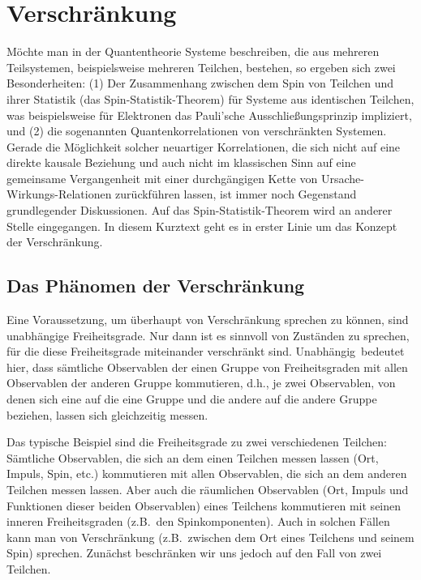
\chapter{Verschr\"ankung}
\label{chap_Entanglement}

M\"ochte man in der Quantentheorie Systeme beschreiben, die aus
mehreren Teilsystemen, beispielsweise mehreren Teilchen, bestehen, so ergeben
sich zwei Besonderheiten: (1) Der Zusammenhang zwischen dem Spin
von Teilchen und ihrer Statistik (das Spin-Statistik-Theorem) f\"ur
Systeme aus identischen Teilchen, was beispielsweise f\"ur Elektronen das Pauli'sche
Ausschlie\ss ungsprinzip impliziert, und
(2) die sogenannten Quantenkorrelationen von verschr\"ankten
Systemen. Gerade die M\"oglichkeit solcher neuartiger
Korrelationen, die sich nicht auf eine direkte kausale 
Beziehung und auch nicht im klassischen Sinn auf eine gemeinsame Vergangenheit
mit einer durchg\"angigen Kette von Ursache-Wirkungs-Relationen
zur\"uckf\"uhren lassen, ist immer noch Gegenstand grundlegender
Diskussionen. Auf das Spin-Statistik-Theorem wird an anderer Stelle
eingegangen. In diesem Kurztext geht es in erster Linie um das Konzept
der Verschr\"ankung. 

\section{Das Ph\"anomen der Verschr\"ankung}

Eine Voraussetzung, um \"uberhaupt von Verschr\"ankung sprechen zu k\"onnen,
sind unabh\"angige Freiheitsgrade. Nur dann ist es sinnvoll von Zust\"anden
zu sprechen, f\"ur die diese Freiheitsgrade miteinander verschr\"ankt sind. 
\glqq Unabh\"angig\grqq\ bedeutet hier,
dass s\"amtliche Observablen der einen Gruppe von Freiheitsgraden mit allen Observablen 
der anderen Gruppe kommutieren, d.h., je zwei Observablen, von denen sich 
eine auf die eine Gruppe und die andere auf die andere Gruppe beziehen, lassen sich gleichzeitig
messen.

Das typische Beispiel sind die Freiheitsgrade zu zwei verschiedenen Teilchen: 
S\"amtliche Observablen, die sich an dem einen Teilchen messen lassen (Ort, Impuls,
Spin, etc.) kommutieren mit allen Observablen, die sich an dem anderen Teilchen
messen lassen. Aber auch die r\"aumlichen Observablen (Ort, Impuls und Funktionen
dieser beiden Observablen) eines Teilchens kommutieren mit seinen inneren
Freiheitsgraden (z.B.\ den Spinkomponenten). Auch in solchen F\"allen kann man
von Verschr\"ankung (z.B.\ zwischen dem Ort eines Teilchens und seinem Spin) sprechen.
Zun\"achst beschr\"anken wir uns jedoch auf den Fall von zwei Teilchen.

